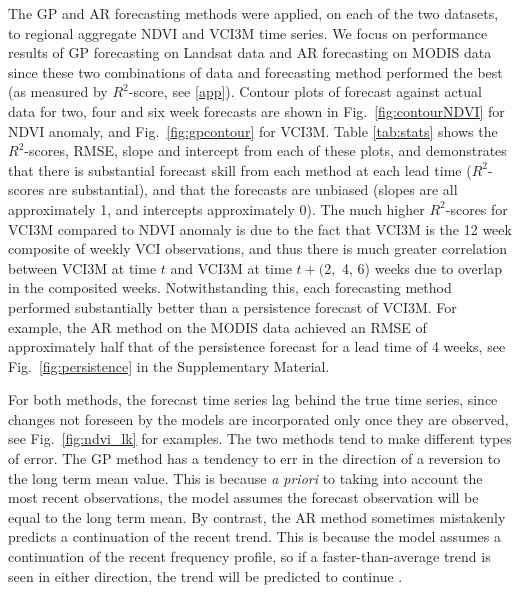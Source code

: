 \documentclass[review]{elsarticle}
\begin{document}
The GP and AR forecasting methods were applied, on each of the two datasets, to regional aggregate NDVI and VCI3M time series. We focus on performance results of GP forecasting on Landsat data and AR forecasting on MODIS data since these two combinations of data and forecasting method performed the best (as measured by $R^2$-score, see \ref{app}). Contour plots of forecast against actual data for two, four and six week forecasts are shown in Fig.~\ref{fig:contourNDVI} for NDVI anomaly, and Fig.~\ref{fig:gpcontour} for VCI3M. Table \ref{tab:stats} shows the $R^2$-scores, RMSE, slope and intercept from each of these plots, and demonstrates that there is substantial forecast skill from each method at each lead time ($R^2$-scores are substantial), and that the forecasts are unbiased (slopes are all approximately 1, and intercepts approximately 0). The much higher $R^2$-scores for VCI3M compared to NDVI anomaly is due to the fact that VCI3M is the 12 week composite of weekly VCI observations, and thus there is much greater correlation between VCI3M at time $t$ and VCI3M at time $t+(2,$ 4, 6) weeks due to overlap in the composited weeks. Notwithstanding this, each forecasting method performed substantially better than a persistence forecast of VCI3M. For example, the AR method on the MODIS data achieved an RMSE of approximately half that of the persistence forecast for a lead time of 4 weeks, see Fig.~\ref{fig:persistence} in the Supplementary Material.

For both methods, the forecast time series lag behind the true time series, since changes not foreseen by the models are incorporated only once they are observed, see Fig.~\ref{fig:ndvi_lk} for examples. The two methods tend to make different types of error. The GP method has a tendency to err in the direction of a reversion to the long term mean value. This is because \textit{a priori} to taking into account the most recent observations, the model assumes the forecast observation will be equal to the long term mean. By contrast, the AR method sometimes mistakenly predicts a continuation of the recent trend. This is because the model assumes a continuation of the recent frequency profile, so if a faster-than-average trend is seen in either direction, the trend will be predicted to continue \citep{Hamilton94}.

\end{document}
